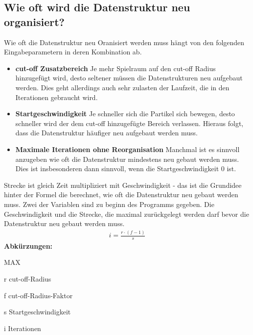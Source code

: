 \documentclass[
	12pt,
	a4paper,
	BCOR10mm,
	DIV14,
	headsepline,
]{scrreprt}
\begin{document}
\subsection{Wie oft wird die Datenstruktur neu organisiert?}
	Wie oft die Datenstruktur neu Oranisiert werden muss hängt von den folgenden Eingabeparametern in deren Kombination ab.
	\begin{itemize}
		\item \textbf{cut-off Zusatzbereich} Je mehr Spielraum auf den cut-off Radius hinzugefügt wird, desto seltener müssen die Datenstrukturen neu aufgebaut werden. Dies geht allerdings auch sehr zulasten der Laufzeit, die in den Iterationen gebraucht wird.
		\item \textbf{Startgeschwindigkeit} Je schneller sich die Partikel sich bewegen, desto schneller wird der dem cut-off hinzugefügte Bereich verlassen. Hieraus folgt, dass die Datenstruktur häufiger neu aufgebaut werden muss.
        \item \textbf{Maximale Iterationen ohne Reorganisation} Manchmal ist es sinnvoll anzugeben wie oft die Datenstruktur mindestens neu gebaut werden muss. Dies ist insbesonderen dann sinnvoll, wenn die Startgeschwindigkeit 0 ist.
	\end{itemize}
	Strecke ist gleich Zeit multipliziert mit Geschwindigkeit - das ist die Grundidee hinter der Formel die berechnet, wie oft die Datenstruktur neu gebaut werden muss. Zwei der Variablen sind zu beginn des Programms gegeben. Die Geschwindigkeit und die Strecke, die maximal zurückgelegt werden darf bevor die Datenstruktur neu gebaut werden muss.
	\begin{align*}
		i=\frac{r \cdot (f - 1)}{s}
	\end{align*}
	\footnotesize\textbf{Abkürzungen:}\begin{labeling}[~--]{MAX}
		\item[r] cut-off-Radius
		\item[f] cut-off-Radius-Faktor
		\item[s] Startgeschwindigkeit
		\item[i] Iterationen
	\end{labeling}
\end{document}
